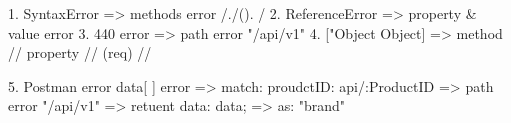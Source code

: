 1. SyntaxError      => methods error /./(). /
2. ReferenceError   => property & value error
3. 440 error        => path error "/api/v1"
4. ["Object Object] => method // property // (req) //

5. Postman error data[ ] error  => match: {proudctID: api/:ProductID} 
                                => path error "/api/v1" 
                                => retuent data: data;
                                => as: "brand" 